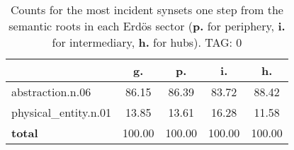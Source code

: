 \begin{table}[h!]
\begin{center}
\begin{tabular}{| l || c | c | c | c |}\hline
 & {\bf g.} & {\bf p.} & {\bf i.} & {\bf h.} \\\hline\hline
abstraction.n.06 & 86.15  & 86.39  & 83.72  & 88.42 \\\hline
physical\_entity.n.01 & 13.85  & 13.61  & 16.28  & 11.58 \\\hline\hline
{{\bf total}} & 100.00  & 100.00  & 100.00  & 100.00 \\\hline
\end{tabular}
\caption{Counts for the most incident synsets one step from the semantic roots in each Erd\"os sector ({\bf p.} for periphery, {\bf i.} for intermediary, {\bf h.} for hubs). TAG: 0}
\end{center}
\end{table}